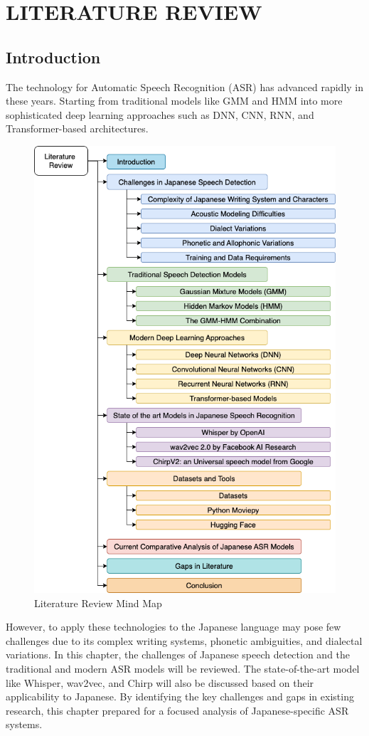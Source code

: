 \chapter{LITERATURE REVIEW}

\section{Introduction}
The technology for Automatic Speech Recognition (ASR) has advanced rapidly in these years. Starting from traditional models like GMM and HMM into more sophisticated deep learning approaches such as DNN, CNN, RNN, and Transformer-based architectures. 

\begin{figure}[H]
    \centering
    \includegraphics[width=.75\textwidth]{mainmatter//images/mindmap.png}
    \caption{Literature Review Mind Map}
\end{figure}

However, to apply these technologies to the Japanese language may pose few challenges due to its complex writing systems, phonetic ambiguities, and dialectal variations. In this chapter, the challenges of Japanese speech detection and the traditional and modern ASR models will be reviewed. The state-of-the-art model like Whisper, wav2vec, and Chirp will also be discussed based on their applicability to Japanese. By identifying the key challenges and gaps in existing research, this chapter prepared for a focused analysis of Japanese-specific ASR systems.

